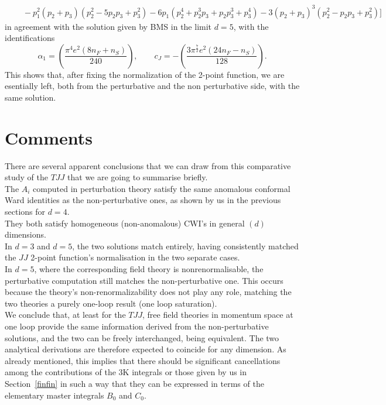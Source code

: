 \documentclass[a4paper,11pt,openright,twoside]{book}
\let\a=\alpha   \let\b=\beta   \let\g=\gamma   \let\d=\delta
\newcommand{\secref}[1]{Section~\ref{#1}}		%
\numberwithin{equation}{section}
\begin{document}
{{\begin{align}
	&\quad-p_1^2 (p_2+p_3) \left(p_2^2-5 p_2 p_3+p_3^2\right)-6 p_1 \left(p_2^4+p_2^3 p_3+p_2 p_3^3+p_3^4\right)-3 (p_2+p_3)^3 \left(p_2^2-p_2 p_3+p_3^2\right)\Big]
\end{align}
in agreement with the solution given by BMS in the limit $d=5$, with the identifications 
\begin{equation}
	\a_1=\left(\frac{\pi ^4 e^2 (8 n_F+n_S)}{240} \right),\qquad c_J=-\left(\frac{3\pi ^\frac{7}{2} e^2 (24 n_F-n_S)}{128 }\right).
\end{equation}
This shows that, after fixing the normalization of the 2-point function, we are esentially left, both from the perturbative and the non perturbative side, with the same solution. 


\section{Comments} 
There are several apparent conclusions that we can draw from this comparative study of the $TJJ$ that we are going to summarise briefly.\\
The $A_i$ computed in perturbation theory satisfy the same anomalous conformal Ward identities as the non-perturbative ones, as shown by us in the previous sections for $d=4$.\\
They both satisfy homogeneous (non-anomalous) CWI's in general $(d)$ dimensions. \\
In $d=3$ and $d=5$, the two solutions match entirely, having consistently matched the $JJ$ 2-point function's normalisation in the two separate cases.\\
In $d=5$, where the corresponding field theory is nonrenormalisable, the perturbative computation still matches the non-perturbative one. This occurs because the theory's non-renormalizability does not play any role, matching the two theories a purely one-loop result (one loop saturation).\\ 
We conclude that, at least for the $TJJ$, free field theories in momentum space at one loop provide the same information derived from the non-perturbative solutions, and the two can be freely interchanged, being equivalent. The two analytical derivations are therefore expected to coincide for any dimension. As already mentioned, this implies that there should be significant cancellations among the contributions of the 3K integrals or those given by us in \secref{finfin} in such a way that they can be expressed in terms of the elementary master integrals $B_0$ and $C_0$.\\
}}
\end{document}
